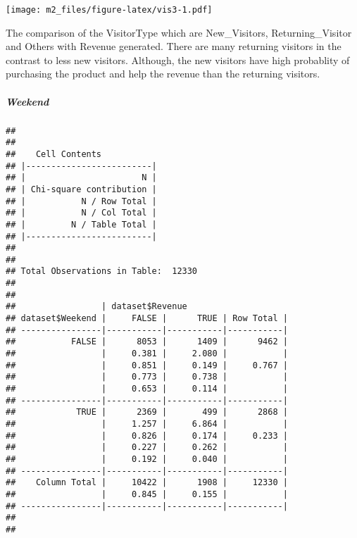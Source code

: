 \documentclass[
]{article}
\newenvironment{Shaded}{\begin{snugshade}}{\end{snugshade}}
\newcommand{\DataTypeTok}[1]{\textcolor[rgb]{0.13,0.29,0.53}{#1}}
\newcommand{\KeywordTok}[1]{\textcolor[rgb]{0.13,0.29,0.53}{\textbf{#1}}}
\newcommand{\NormalTok}[1]{#1}
\newcommand{\OperatorTok}[1]{\textcolor[rgb]{0.81,0.36,0.00}{\textbf{#1}}}
\newcommand{\OtherTok}[1]{\textcolor[rgb]{0.56,0.35,0.01}{#1}}
\newcommand{\StringTok}[1]{\textcolor[rgb]{0.31,0.60,0.02}{#1}}
\begin{document}
\begin{Shaded}
\end{Shaded}

\texttt{[image: m2\_files/figure-latex/vis3-1.pdf]}

The comparison of the VisitorType which are New\_Visitors,
Returning\_Visitor and Others with Revenue generated. There are many
returning visitors in the contrast to less new visitors. Although, the
new visitors have high probablity of purchasing the product and help the
revenue than the returning visitors.

\hypertarget{weekend}{%
\subparagraph{Weekend}\label{weekend}}

\begin{Shaded}
\end{Shaded}

\begin{verbatim}
## 
##  
##    Cell Contents
## |-------------------------|
## |                       N |
## | Chi-square contribution |
## |           N / Row Total |
## |           N / Col Total |
## |         N / Table Total |
## |-------------------------|
## 
##  
## Total Observations in Table:  12330 
## 
##  
##                 | dataset$Revenue 
## dataset$Weekend |     FALSE |      TRUE | Row Total | 
## ----------------|-----------|-----------|-----------|
##           FALSE |      8053 |      1409 |      9462 | 
##                 |     0.381 |     2.080 |           | 
##                 |     0.851 |     0.149 |     0.767 | 
##                 |     0.773 |     0.738 |           | 
##                 |     0.653 |     0.114 |           | 
## ----------------|-----------|-----------|-----------|
##            TRUE |      2369 |       499 |      2868 | 
##                 |     1.257 |     6.864 |           | 
##                 |     0.826 |     0.174 |     0.233 | 
##                 |     0.227 |     0.262 |           | 
##                 |     0.192 |     0.040 |           | 
## ----------------|-----------|-----------|-----------|
##    Column Total |     10422 |      1908 |     12330 | 
##                 |     0.845 |     0.155 |           | 
## ----------------|-----------|-----------|-----------|
## 
## 
\end{verbatim}
\end{document}
